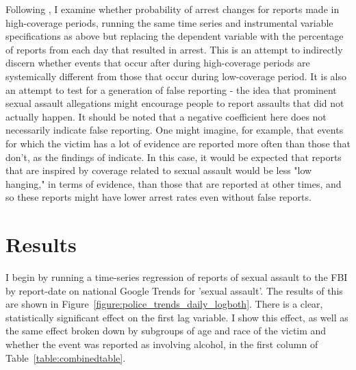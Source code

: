 \documentclass[AER,draftmode]{AEA}
\begin{document}
Following , I examine whether probability of arrest changes for reports made in high-coverage periods, running the same time series and instrumental variable specifications as above but replacing the dependent variable with the percentage of reports from each day that resulted in arrest. This is an attempt to indirectly discern whether events that occur after during high-coverage periods are systemically different from those that occur during low-coverage period. It is also an attempt to test for a generation of false reporting - the idea that prominent sexual assault allegations might encourage people to report assaults that did not actually happen. It should be noted that a negative coefficient here does not necessarily indicate false reporting. One might imagine, for example, that events for which the victim has a lot of evidence are reported more often than those that don't, as the findings of  indicate. In this case, it would be expected that reports that are inspired by coverage related to sexual assault would be less "low hanging," in terms of evidence, than those that are reported at other times, and so these reports might have lower arrest rates even without false reports. 

\section{Results}

I begin by running a time-series regression of reports of sexual assault to the FBI by report-date on national Google Trends for 'sexual assault'. The results of this are shown in Figure~\ref{figure:police_trends_daily_logboth}. There is a clear, statistically significant effect on the first lag variable. I show this effect, as well as the same effect broken down by subgroups of age and race of the victim and whether the event was reported as involving alcohol, in the first column of Table~\ref{table:combinedtable}. 
\end{document}
